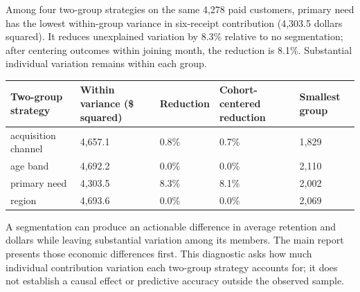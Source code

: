 \documentclass[10pt]{article}
\begin{document}
\NewPage
{}
Among four two-group strategies on the same 4,278 paid customers, primary need has the lowest within-group variance in six-receipt contribution (4,303.5 dollars squared). It reduces unexplained variation by 8.3\% relative to no segmentation; after centering outcomes within joining month, the reduction is 8.1\%. Substantial individual variation remains within each group.
\par\begin{tabularx}{\linewidth}{@{}YYYYY@{}}\toprule
\textbf{Two-group strategy} & \textbf{Within variance (\$ squared)} & \textbf{Reduction} & \textbf{Cohort-centered reduction} & \textbf{Smallest group}\\\midrule
acquisition channel & 4,657.1 & 0.8\% & 0.7\% & 1,829\\
age band & 4,692.2 & 0.0\% & 0.0\% & 2,110\\
primary need & 4,303.5 & 8.3\% & 8.1\% & 2,002\\
region & 4,693.6 & 0.0\% & 0.0\% & 2,069\\
\bottomrule\end{tabularx}\par
{}
A segmentation can produce an actionable difference in average retention and dollars while leaving substantial variation among its members. The main report presents those economic differences first. This diagnostic asks how much individual contribution variation each two-group strategy accounts for; it does not establish a causal effect or predictive accuracy outside the observed sample.
\end{document}
